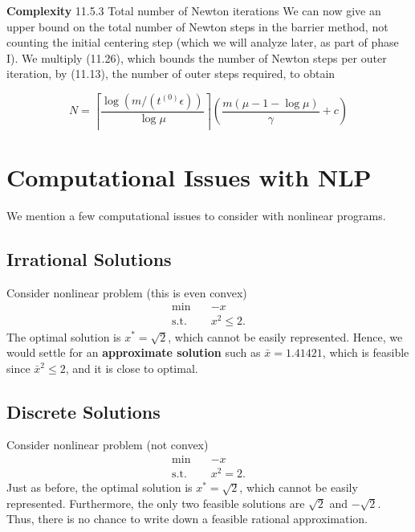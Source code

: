 \textbf{Complexity}
11.5.3 Total number of Newton iterations
We can now give an upper bound on the total number of Newton steps in the barrier method, not counting the initial centering step (which we will analyze later, as part of phase I). We multiply (11.26), which bounds the number of Newton steps per outer iteration, by (11.13), the number of outer steps required, to obtain

$$
N=\left\lceil\frac{\log \left(m /\left(t^{(0)} \epsilon\right)\right)}{\log \mu}\right\rceil\left(\frac{m(\mu-1-\log \mu)}{\gamma}+c\right)
$$



\chapter{Computational Issues with NLP}
We mention a few computational issues to consider with nonlinear programs.  
\section{Irrational Solutions}
Consider nonlinear problem (this  is even convex)
\begin{equation}
\begin{array}{rl}
\min \quad & -x\\
\text{s.t.} \quad & x^2 \leq 2.
\end{array}
\end{equation}
The optimal solution is $x^* = \sqrt{2}$, which cannot be easily represented.  Hence, we would settle for an \textbf{approximate solution} such as $\bar x = 1.41421$, which is feasible since $\bar x^2 \leq 2$, and it is close to optimal.

\section{Discrete Solutions}
Consider nonlinear problem (not convex)
\begin{equation}
\begin{array}{rl}
\min \quad & -x\\
\text{s.t.} \quad & x^2 = 2.
\end{array}
\end{equation}
Just as before, the optimal solution is $x^* = \sqrt{2}$, which cannot be easily represented.  Furthermore, the only two feasible solutions are $\sqrt{2}$ and $-\sqrt{2}$.  Thus, there is no chance to write down a feasible rational approximation.

